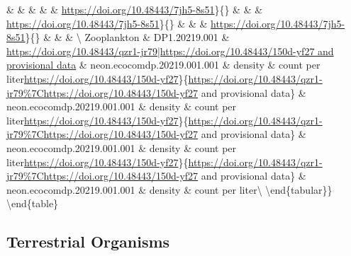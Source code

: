 \documentclass[
  12pt,
]{article}
\begin{document}
 \&  \& \href{https://doi.org/10.48443/dx40-wr20|https://doi.org/10.48443/7jh5-8s51}{} \&  \&  \& \textbar{}\url{https://doi.org/10.48443/7jh5-8s51}\}\{\} \&  \&  \& \textbar{}\url{https://doi.org/10.48443/7jh5-8s51}\}\{\} \&  \&  \& \textbar{}\url{https://doi.org/10.48443/7jh5-8s51}\}\{\} \&  \&  \& \textbackslash{}
Zooplankton \& DP1.20219.001 \& \href{https://doi.org/10.48443/qzr1-jr79|https://doi.org/10.48443/150d-yf27}{https://doi.org/10.48443/qzr1-jr79|https://doi.org/10.48443/150d-yf27 and provisional data} \& neon.ecocomdp.20219.001.001 \& density \& count per liter\textbar{}\url{https://doi.org/10.48443/150d-yf27}\}\{\url{https://doi.org/10.48443/qzr1-jr79\%7Chttps://doi.org/10.48443/150d-yf27} and provisional data\} \& neon.ecocomdp.20219.001.001 \& density \& count per liter\textbar{}\url{https://doi.org/10.48443/150d-yf27}\}\{\url{https://doi.org/10.48443/qzr1-jr79\%7Chttps://doi.org/10.48443/150d-yf27} and provisional data\} \& neon.ecocomdp.20219.001.001 \& density \& count per liter\textbar{}\url{https://doi.org/10.48443/150d-yf27}\}\{\url{https://doi.org/10.48443/qzr1-jr79\%7Chttps://doi.org/10.48443/150d-yf27} and provisional data\} \& neon.ecocomdp.20219.001.001 \& density \& count per liter\textbackslash{}
\bottomrule
\textbackslash end\{tabular\}\}
\textbackslash end\{table\}

\hypertarget{terrestrial-organisms}{%
\subsection{Terrestrial Organisms}\label{terrestrial-organisms}}
\end{document}
